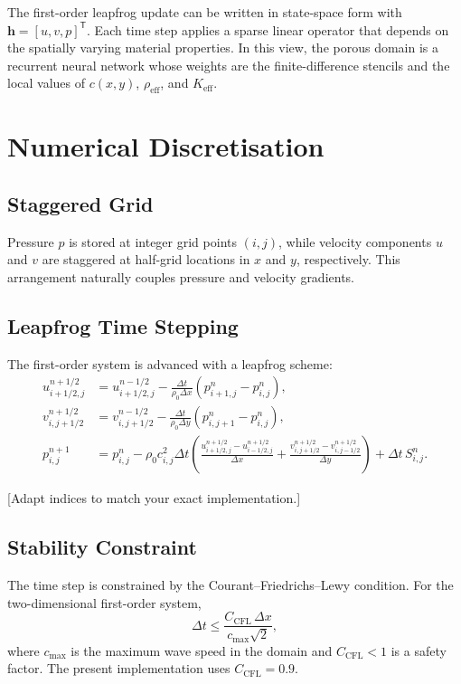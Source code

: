 The first-order leapfrog update can be written in state-space form with $\mathbf{h} = [u, v, p]^\mathsf{T}$. Each time step applies a sparse linear operator that depends on the spatially varying material properties. In this view, the porous domain is a recurrent neural network whose weights are the finite-difference stencils and the local values of $c(x,y)$, $\rho_\mathrm{eff}$, and $K_\mathrm{eff}$.

\section{Numerical Discretisation}
\label{sec:fdtd_discretisation}

\subsection{Staggered Grid}
\label{subsec:staggered_grid}

Pressure $p$ is stored at integer grid points $(i,j)$, while velocity components $u$ and $v$ are staggered at half-grid locations in $x$ and $y$, respectively. This arrangement naturally couples pressure and velocity gradients.

\subsection{Leapfrog Time Stepping}
\label{subsec:leapfrog}

The first-order system is advanced with a leapfrog scheme:
\begin{align}
    u^{n+1/2}_{i+1/2,j} &= u^{n-1/2}_{i+1/2,j} - \frac{\Delta t}{\rho_0 \Delta x}\left(p^n_{i+1,j} - p^n_{i,j}\right), \\
    v^{n+1/2}_{i,j+1/2} &= v^{n-1/2}_{i,j+1/2} - \frac{\Delta t}{\rho_0 \Delta y}\left(p^n_{i,j+1} - p^n_{i,j}\right), \\
    p^{n+1}_{i,j} &= p^n_{i,j} - \rho_0 c^2_{i,j} \Delta t \left(\frac{u^{n+1/2}_{i+1/2,j} - u^{n+1/2}_{i-1/2,j}}{\Delta x} + \frac{v^{n+1/2}_{i,j+1/2} - v^{n+1/2}_{i,j-1/2}}{\Delta y}\right) + \Delta t \, S^n_{i,j}.
\end{align}

[Adapt indices to match your exact implementation.]

\subsection{Stability Constraint}
\label{subsec:cfl}

The time step is constrained by the Courant--Friedrichs--Lewy condition. For the two-dimensional first-order system,
\begin{equation}
    \Delta t \leq \frac{C_\mathrm{CFL} \, \Delta x}{c_\mathrm{max} \sqrt{2}},
\end{equation}
where $c_\mathrm{max}$ is the maximum wave speed in the domain and $C_\mathrm{CFL} < 1$ is a safety factor. The present implementation uses $C_\mathrm{CFL} = 0.9$.

